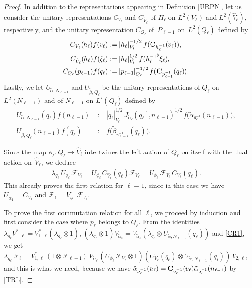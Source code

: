 \documentclass[10pt,a4paper]{amsart}
\newcommand{\CF}{\mathcal F}
\newcommand{\F}{{\mathcal F}}
\begin{document}
\begin{proof}
In addition to the representations appearing in Definition \ref{URPN}, let us consider the unitary representations $C_{V_\ell}$ and $C_{\hat V_\ell}$ of $H_\ell$ on
$L^2(V_\ell)$ and $L^2(\hat V_\ell)$, respectively, and the unitary representation $C_{Q_\ell}$ of~$P_{\ell-1}$ on~$L^2 (Q_\ell )$ defined by
\begin{align*}
C_{V_\ell}(h_\ell)f(v_\ell)&:=|h_\ell|_{V_\ell}^{-1/2}\,f({\bf C}_{h_\ell^{-1}}(v_\ell)),\\
C_{\hat V_\ell}(h_\ell)f(\xi_\ell)&:=|h_\ell|_{V_\ell}^{1/2}\,f({h_\ell^{-1}}^\flat\xi_\ell),\\
C_{Q_\ell}(p_{\ell-1})f(q_\ell)&:=|p_{\ell-1}|_{Q_\ell}^{-1/2}\,f({\bf C}_{p_{\ell-1}^{-1}}(q_\ell)).
\end{align*}
Lastly, we let $U_{\tilde\alpha,N_{\ell-1}}$ and $U_{\tilde\beta,Q_\ell}$ be the unitary representations of $Q_\ell$  on $L^2(N_{\ell-1})$  and  of $N_{\ell-1}$  on $L^2(Q_\ell )$ defined by
\begin{align*}
U_{\tilde\alpha,N_{\ell-1}}( q_\ell)f(n_{\ell-1})&:=|q_\ell|_{V_\ell}^{1/2}\,J_{\tilde\alpha_\ell}(q_\ell^{-1},n_{\ell-1})^{1/2}\, f\big(\tilde\alpha_{q_\ell^{-1}}(n_{\ell-1})\big),\\
U_{\tilde\beta,Q_\ell}(n_{\ell-1} )f(q_\ell)&:= f\big(\tilde\beta_{n_{\ell-1}^{-1}}(q_\ell)\big).
\end{align*}

Since the map $\phi_\ell:Q_\ell\to\hat V_\ell$ intertwines the left action of $Q_\ell$ on itself with the dual action on~$\hat V_\ell$,
 we deduce
 \begin{align}
 \label{CR1}
  \lambda_{q_\ell}\, U_{\phi_\ell}\,\F_{V_\ell}= U_{\phi_\ell}\,C_{\hat V_\ell}(q_\ell)\F_{V_\ell}= U_{\phi_\ell}\,\F_{V_\ell}\, C_{V_\ell}(q_\ell).
  \end{align}
This already proves the first relation for   $\ell=1$,  since in this case we have $U_{\tilde \alpha_1}=C_{V_1}$ and  $\CF_1=V_{\phi_1}\,\F_{V_1}$.

To prove the first commutation relation for all $\ell$, we proceed by induction and first consider the case where $p_\ell$ belongs to $Q_\ell$. From
the identities $ \lambda_{  q_\ell}V_{1,\ell}^*=V_{1,\ell}^*( \lambda_{q_\ell}\otimes 1)$, $( \lambda_{q_\ell}\otimes 1)  V_{\tilde\alpha_\ell} = V_{\tilde\alpha_\ell} (
  \lambda_{q_\ell}\otimes U_{\tilde\alpha,N_{\ell-1}}(q_\ell))$ and \eqref{CR1}, we get
 $$
 \lambda_{  q_\ell}\,\F_\ell=V_{1,\ell}^*\,(1\otimes \F_{\ell-1})\, V_{\tilde\alpha_\ell} \,
 (  U_{\phi_\ell}\,\F_{V_\ell}\otimes 1)(C_{V_\ell}(q_\ell)\otimes U_{\tilde\alpha,N_{\ell-1}}(q_\ell))\,V_{2,\ell},
$$
 and this is what we need,  because we have
$ \tilde\alpha_{ p_\ell^{-1}}(n_\ell)
={\bf C}_{ q_\ell^{-1}}(v_\ell)\tilde\alpha_{q_\ell^{-1}}(n_{\ell-1})$ by \eqref{TRL}.


\end{proof}
\end{document}
